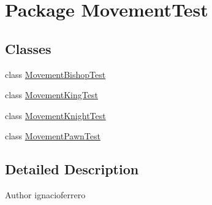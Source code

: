 \hypertarget{namespace_movement_test}{\section{Package Movement\-Test}
\label{namespace_movement_test}
}
\subsection*{Classes}
\begin{DoxyCompactItemize}
\item 
class \hyperlink{class_movement_test_1_1_movement_bishop_test}{Movement\-Bishop\-Test}
\item 
class \hyperlink{class_movement_test_1_1_movement_king_test}{Movement\-King\-Test}
\item 
class \hyperlink{class_movement_test_1_1_movement_knight_test}{Movement\-Knight\-Test}
\item 
class \hyperlink{class_movement_test_1_1_movement_pawn_test}{Movement\-Pawn\-Test}
\end{DoxyCompactItemize}


\subsection{Detailed Description}
\begin{DoxyAuthor}{Author}
ignacioferrero 
\end{DoxyAuthor}

